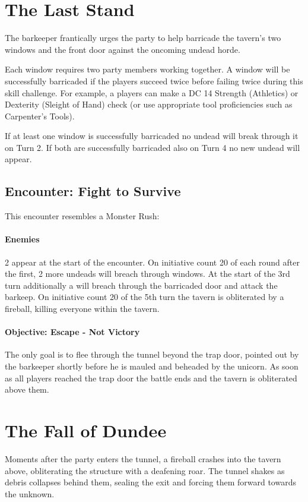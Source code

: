 \section*{The Last Stand}
{\entryfont The barkeeper frantically urges the party to help barricade the tavern's two windows and the front door against the oncoming undead horde.

Each window requires two party members working together. A window will be successfully barricaded if the players succeed twice before failing twice during this skill challenge. For example, a players can make a DC 14 Strength (Athletics) or Dexterity (Sleight of Hand) check (or use appropriate tool proficiencies such as Carpenter's Tools).

If at least one window is successfully barricaded no undead will break through it on Turn 2. If both are successfully barricaded also on Turn 4 no new undead will appear.}
\subsection*{Encounter: Fight to Survive}
{\entryfont This encounter resembles a Monster Rush:
\paragraph*{Enemies} 2 \hyperref[monster:UndeadSoldier]{} appear at the start of the encounter. On initiative count 20 of each round after the first, 2 more undeads will breach through windows. At the start of the 3rd turn additionally a \hyperref[monster:CorruptedUnicorn]{} will breach through the barricaded door and attack the barkeep. On initiative count 20 of the 5th turn the tavern is obliterated by a fireball, killing everyone within the tavern.
\paragraph*{Objective: Escape - Not Victory} The only goal is to flee through the tunnel beyond the trap door, pointed out by the barkeeper shortly before he is mauled and beheaded by the unicorn. As soon as all players reached the trap door the battle ends and the tavern is obliterated above them.}

\section*{The Fall of Dundee}
{\entryfont Moments after the party enters the tunnel, a fireball crashes into the tavern above, obliterating the structure with a deafening roar. The tunnel shakes as debris collapses behind them, sealing the exit and forcing them forward towards the unknown.}

